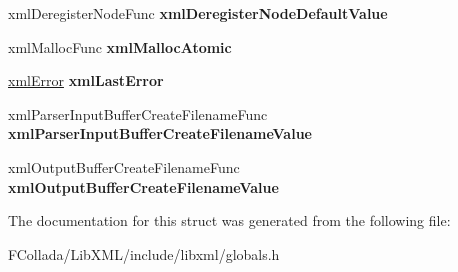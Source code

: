 \begin{DoxyCompactItemize}
\item 
\hypertarget{struct__xmlGlobalState_a7dd29e256c9eeb78789c6f483bd4098b}{
xmlDeregisterNodeFunc {\bfseries xmlDeregisterNodeDefaultValue}}
\label{struct__xmlGlobalState_a7dd29e256c9eeb78789c6f483bd4098b}

\item 
\hypertarget{struct__xmlGlobalState_ab2b37c13cce8ccc8a7bb0e0a47474563}{
xmlMallocFunc {\bfseries xmlMallocAtomic}}
\label{struct__xmlGlobalState_ab2b37c13cce8ccc8a7bb0e0a47474563}

\item 
\hypertarget{struct__xmlGlobalState_afd5f9c9dc58ab8f75fb0074370e18bbb}{
\hyperlink{struct__xmlError}{xmlError} {\bfseries xmlLastError}}
\label{struct__xmlGlobalState_afd5f9c9dc58ab8f75fb0074370e18bbb}

\item 
\hypertarget{struct__xmlGlobalState_a4426a58b33b2f1db58f66c4a01d1044c}{
xmlParserInputBufferCreateFilenameFunc {\bfseries xmlParserInputBufferCreateFilenameValue}}
\label{struct__xmlGlobalState_a4426a58b33b2f1db58f66c4a01d1044c}

\item 
\hypertarget{struct__xmlGlobalState_ad9c2ba58bc1b222cd1189a265a137276}{
xmlOutputBufferCreateFilenameFunc {\bfseries xmlOutputBufferCreateFilenameValue}}
\label{struct__xmlGlobalState_ad9c2ba58bc1b222cd1189a265a137276}

\end{DoxyCompactItemize}


The documentation for this struct was generated from the following file:\begin{DoxyCompactItemize}
\item 
FCollada/LibXML/include/libxml/globals.h\end{DoxyCompactItemize}
